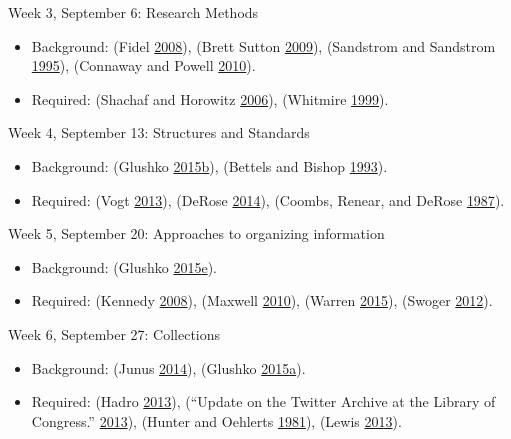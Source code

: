 \documentclass[]{article}
\providecommand{\tightlist}{%
  \setlength{\itemsep}{0pt}\setlength{\parskip}{0pt}}
\begin{document}
Week 3, September 6: Research Methods

\begin{itemize}
\tightlist
\item
  Background: (Fidel
  \protect\hyperlink{ref-fidelux5fareux5f2008}{2008}), (Brett Sutton
  \protect\hyperlink{ref-brettux5fsuttonux5fqualitativeux5f2009}{2009}),
  (Sandstrom and Sandstrom
  \protect\hyperlink{ref-sandstromux5fuseux5f1995}{1995}), (Connaway and
  Powell \protect\hyperlink{ref-connawayux5fselectingux5f2010}{2010}).
\item
  Required: (Shachaf and Horowitz
  \protect\hyperlink{ref-shachafux5fareux5f2006}{2006}), (Whitmire
  \protect\hyperlink{ref-whitmireux5fracialux5f1999}{1999}).
\end{itemize}

Week 4, September 13: Structures and Standards

\begin{itemize}
\tightlist
\item
  Background: (Glushko
  \protect\hyperlink{ref-glushkoux5fdescribingux5f2015}{2015}\protect\hyperlink{ref-glushkoux5fdescribingux5f2015}{b}),
  (Bettels and Bishop
  \protect\hyperlink{ref-bettelsux5funicode:ux5f1993}{1993}).
\item
  Required: (Vogt
  \protect\hyperlink{ref-vogtux5fescienceux5f2013}{2013}), (DeRose
  \protect\hyperlink{ref-deroseux5fwhatux5f2014}{2014}), (Coombs,
  Renear, and DeRose
  \protect\hyperlink{ref-coombsux5fmarkupux5f1987}{1987}).
\end{itemize}

Week 5, September 20: Approaches to organizing information

\begin{itemize}
\tightlist
\item
  Background: (Glushko
  \protect\hyperlink{ref-glushkoux5fresourcesux5f2015}{2015}\protect\hyperlink{ref-glushkoux5fresourcesux5f2015}{e}).
\item
  Required: (Kennedy
  \protect\hyperlink{ref-kennedyux5fnineux5f2008}{2008}), (Maxwell
  \protect\hyperlink{ref-maxwellux5fbibliographicux5f2010}{2010}),
  (Warren \protect\hyperlink{ref-warrenux5f2015ux5f2015}{2015}), (Swoger
  \protect\hyperlink{ref-swogerux5f.ux5f2012}{2012}).
\end{itemize}

Week 6, September 27: Collections

\begin{itemize}
\tightlist
\item
  Background: (Junus
  \protect\hyperlink{ref-junusux5fdigitalux5f2014}{2014}), (Glushko
  \protect\hyperlink{ref-glushkoux5factivitiesux5f2015}{2015}\protect\hyperlink{ref-glushkoux5factivitiesux5f2015}{a}).
\item
  Required: (Hadro
  \protect\hyperlink{ref-hadroux5fwhatsux5f2013}{2013}), (``Update on
  the Twitter Archive at the Library of Congress.''
  \protect\hyperlink{ref-ux5fupdateux5f2013}{2013}), (Hunter and
  Oehlerts \protect\hyperlink{ref-hunterux5ftwoux5f1981}{1981}), (Lewis
  \protect\hyperlink{ref-lewisux5fstacksux5f2013}{2013}).
\end{itemize}
\end{document}
